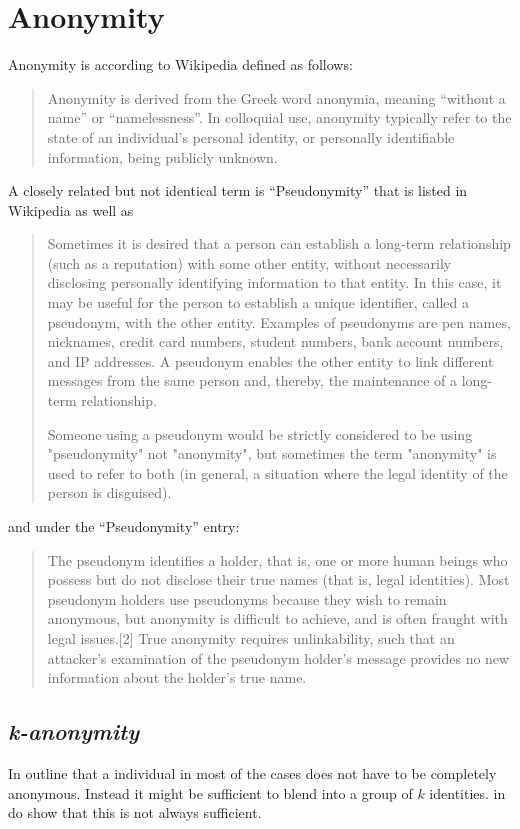 \section{Anonymity}
Anonymity is according to Wikipedia\cite{wiki:anonymity} defined as follows:
\begin{quote}
Anonymity is derived from the Greek word anonymia, meaning "`without a name"' or "`namelessness"'. In colloquial use, anonymity typically refer to the state of an individual's personal identity, or personally identifiable information, being publicly unknown.
\end{quote}
A closely related but not identical term is "`Pseudonymity"' that is listed in Wikipedia as well as
\begin{quote}
Sometimes it is desired that a person can establish a long-term relationship (such as a reputation) with some other entity, without necessarily disclosing personally identifying information to that entity. In this case, it may be useful for the person to establish a unique identifier, called a pseudonym, with the other entity. Examples of pseudonyms are pen names, nicknames, credit card numbers, student numbers, bank account numbers, and IP addresses. A pseudonym enables the other entity to link different messages from the same person and, thereby, the maintenance of
a long-term relationship. \par
Someone using a pseudonym would be strictly considered to be using "pseudonymity" not "anonymity", but sometimes the term "anonymity" is used to refer to both (in general, a situation where the legal identity of the person is disguised).
\end{quote}
and under the "`Pseudonymity"' \cite{wiki:pseudonymity} entry:
\begin{quote}
The pseudonym identifies a holder, that is, one or more human beings who possess but do not disclose their true names (that is, legal identities). Most pseudonym holders use pseudonyms because they wish to remain anonymous, but anonymity is difficult to achieve, and is often fraught with legal issues.[2] True anonymity requires unlinkability, such that an attacker's examination of the pseudonym holder's message provides no new information about the holder's true name.
\end{quote}

\subsection{\itshape{k}-anonymity}
In \cite{k-anonymous:ccs2003} \citeauthor{k-anonymous:ccs2003} outline that a individual in most of the cases does not have to be completely anonymous. Instead it might be sufficient to blend into a group of $k$ identities. in \cite{wpes10-unraveling} \citeauthor{wpes10-unraveling} do show that this is not always sufficient. 

